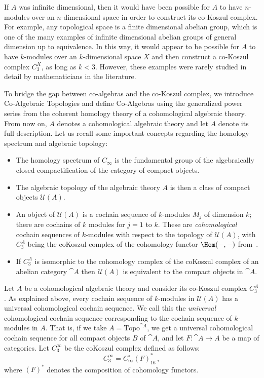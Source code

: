 \documentclass[a4paper,reqno,oneside]{article}
\begin{document}
If $A$ was infinite dimensional, then it would have been possible for $A$ to have $n$-modules over an $n$-dimensional space in order to construct its co-Koszul complex. For example, any topological space is a finite dimensional abelian group, which is one of the many examples of infinite dimensional abelian groups of general dimension up to equivalence. In this way, it would appear to be possible for $A$ to have $k$-modules over an $k$-dimensional space $X$ and then construct a co-Koszul complex $C_{3}^{X}$, as long as $k<3$.
However, these examples were rarely studied in detail by mathematicians in the literature. 

To bridge the gap between co-algebras and the co-Koszul complex, we introduce Co-Algebraic Topologies and define Co-Algebras using the generalized power series from the coherent homology theory of a cohomological algebraic theory. From now on, $A$ denotes a cohomological algebraic theory and let $A$ denote its full description. Let us recall some important concepts regarding the homology spectrum and algebraic topology:
\begin{itemize}
    \item The homology spectrum of $C_{\infty}$ is the fundamental group of the algebraically closed compactification of the category of compact objects. 
    \item The algebraic topology of the algebraic theory $A$ is then a class of compact objects $\mathcal{U}(A)$.
    \item An object of $\mathcal{U}(A)$ is a cochain sequence of $k$-modules $M_j$ of dimension $k$; there are cochains of $k$ modules for $j=1$ to $k$. These are \emph{cohomological} cochain sequences of $k$-modules with respect to the topology of $\mathcal{U}(A)$, with $C_{3}^{A}$ being the coKoszul complex of the cohomology functor $\Hom(-,-)$ from~\cite{Nakayama1995}.  
    \item If $C_{3}^{A}$ is isomorphic to the cohomology complex of the coKoszul complex of an abelian category $\cat{A}$ then $\mathcal{U}(A)$ is equivalent to the compact objects in $\cat{A}$.
\end{itemize}
Let $A$ be a cohomological algebraic theory and consider its co-Koszul complex $C_{3}^{A}$. As explained above, every cochain sequence of $k$-modules in $\mathcal{U}(A)$ has a universal cohomological cochain sequence. We call this the \emph{universal} cohomological cochain sequence corresponding to the cochain sequence of $k$-modules in $A$. That is, if we take $A=\mathrm{Topo}^{\cat{A}}$, we get a universal cohomological cochain sequence for all compact objects $B$ of $\cat{A}$, and let $F:\cat{A}\rightarrow A$ be a map of categories. Let $C^{\infty}_{3}$ be the coKoszul complex defined as follows: 
\[
C^{\infty}_{3} = C_{\infty}^\circ (F)^*_{16}\,,
\]
where $(F)^*$ denotes the composition of cohomology functors.
\end{document}
